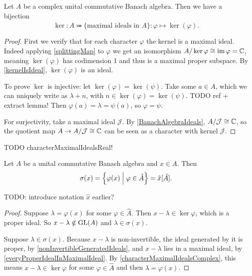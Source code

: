 \begin{proposition} \label{characterMaximalIdealsComplex}
Let $A$ be a complex unital commutative Banach algebra. Then we have a bijection
\[ \ker: \hat{A} \twoheadrightarrowtail \{\text{maximal ideals in $A$}\}: \varphi \mapsto \ker(\varphi).  \]
\end{proposition}
\begin{proof}
First we verify that for each character $\varphi$ the kernel is a maximal ideal. Indeed applying \ref{splittingMap} to $\varphi$ we get an isomorphism $A/\ker\varphi \cong \operatorname{im}\varphi = \mathbb{C}$, meaning $\ker(\varphi)$ has codimension 1 and thus is a maximal proper subspace. By \ref{kernelIsIdeal}, $\ker(\varphi)$ is an ideal.

To prove $\ker$ is injective: let $\ker(\varphi) = \ker(\psi)$. Take some $a\in A$, which we can uniquely write as $\lambda+n$, with $n\in\ker(\varphi) = \ker(\psi)$. TODO ref + extract lemma! Then $\varphi(a) = \lambda = \psi(a)$, so $\varphi = \psi$.

For surjectivity, take a maximal ideal $\mathcal{J}$.
By \ref{BanachAlgebraIdeals}, $A/\mathcal{J}\cong \mathbb{C}$, so the quotient map $A\to A/\mathcal{J}\cong \mathbb{C}$ can be seen as a character with kernel $\mathcal{J}$.
\end{proof}

TODO characterMaximalIdealsReal!


\begin{proposition} \label{spectrumFromSpectrum}
Let $A$ be a unital commutative Banach algebra and $x\in A$. Then
\[ \sigma(x) = \left\{ \varphi(x) \;\middle|\; \varphi\in\hat{A} \right\} = \hat{x}[\hat{A}]. \]
\end{proposition}
TODO: introduce notation $\hat{x}$ earlier?
\begin{proof}
Suppose $\lambda = \varphi(x)$ for some $\varphi\in\hat{A}$. Then $x-\lambda\in\ker\varphi$, which is a proper ideal.
So $x-\lambda \notin\operatorname{GL}(A)$ and $\lambda \in\sigma(x)$.

Suppose $\lambda \in \sigma(x)$. Because $x-\lambda$ is non-invertible, the ideal generated by it is proper, by \ref{nonInvertibleGeneratedIdeals}, and $x-\lambda$ lies in a maximal ideal, by \ref{everyProperIdealInMaximalIdeal}. By \ref{characterMaximalIdealsComplex}, this means $x-\lambda \in \ker\varphi$ for some $\varphi\in\hat{A}$ and then $\lambda = \varphi(x)$.
\end{proof}

